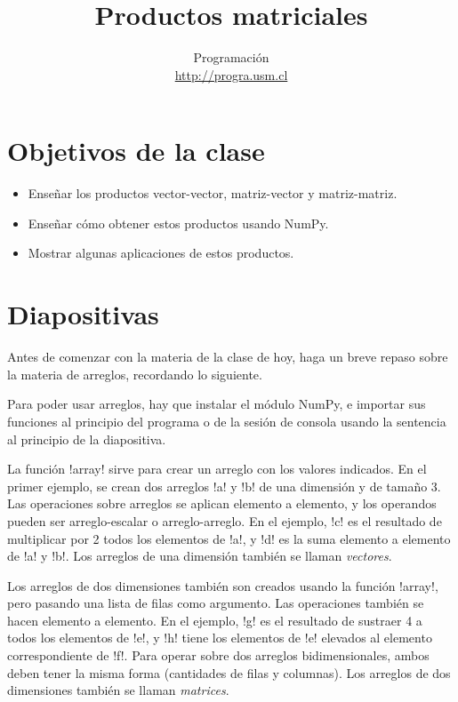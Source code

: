 \documentclass[10pt]{article}
\title{Productos matriciales}
\author{Programación \\ \url{http://progra.usm.cl}}
\date{}
\begin{document}
  \maketitle

  \section*{Objetivos de la clase}
  \begin{itemize}
    \item Enseñar los productos
      vector-vector, matriz-vector y matriz-matriz.
    \item Enseñar cómo obtener estos productos usando NumPy.
    \item Mostrar algunas aplicaciones de estos productos.
  \end{itemize}

  \section*{Diapositivas}


  Antes de comenzar con la materia de la clase de hoy,
  haga un breve repaso sobre la materia de arreglos,
  recordando lo siguiente.

  Para poder usar arreglos,
  hay que instalar el módulo NumPy,
  e importar sus funciones al principio del programa
  o de la sesión de consola
  usando la sentencia al principio de la diapositiva.

  La función \li!array! sirve para crear un arreglo
  con los valores indicados.
  En el primer ejemplo,
  se crean dos arreglos \li!a! y \li!b! de una dimensión y de tamaño 3.
  Las operaciones sobre arreglos se aplican elemento a elemento,
  y los operandos pueden ser arreglo-escalar o arreglo-arreglo.
  En el ejemplo,
  \li!c! es el resultado de multiplicar por 2 todos los elementos de \li!a!,
  y \li!d! es la suma elemento a elemento de \li!a! y \li!b!.
  Los arreglos de una dimensión también se llaman \emph{vectores}.

  Los arreglos de dos dimensiones
  también son creados usando la función \li!array!,
  pero pasando una lista de filas como argumento.
  Las operaciones también se hacen elemento a elemento.
  En el ejemplo,
  \li!g! es el resultado de sustraer 4 a todos los elementos de \li!e!,
  y  \li!h! tiene los elementos de \li!e!
  elevados al elemento correspondiente de \li!f!.
  Para operar sobre dos arreglos bidimensionales,
  ambos deben tener la misma forma (cantidades de filas y columnas).
  Los arreglos de dos dimensiones también se llaman \emph{matrices}.
\end{document}
